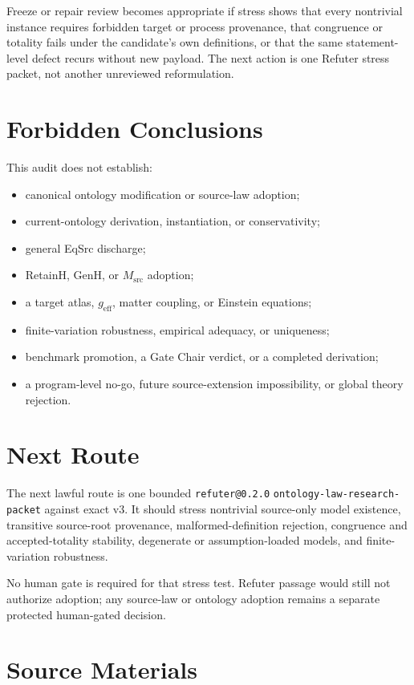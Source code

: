 \documentclass[11pt]{article}
\begin{document}
Freeze or repair review becomes appropriate if stress shows that every
nontrivial instance requires forbidden target or process provenance, that
congruence or totality fails under the candidate's own definitions, or that
the same statement-level defect recurs without new payload. The next action is
one Refuter stress packet, not another unreviewed reformulation.

\section{Forbidden Conclusions}

This audit does not establish:
\begin{itemize}[leftmargin=*]
  \item canonical ontology modification or source-law adoption;
  \item current-ontology derivation, instantiation, or conservativity;
  \item general EqSrc discharge;
  \item RetainH, GenH, or \(M_{\mathrm{src}}\) adoption;
  \item a target atlas, \(g_{\mathrm{eff}}\), matter coupling, or Einstein
  equations;
  \item finite-variation robustness, empirical adequacy, or uniqueness;
  \item benchmark promotion, a Gate Chair verdict, or a completed derivation;
  \item a program-level no-go, future source-extension impossibility, or
  global theory rejection.
\end{itemize}

\section{Next Route}

The next lawful route is one bounded \texttt{refuter@0.2.0}
\texttt{ontology-law-research-packet} against exact v3. It should stress
nontrivial source-only model existence, transitive source-root provenance,
malformed-definition rejection, congruence and accepted-totality stability,
degenerate or assumption-loaded models, and finite-variation robustness.

No human gate is required for that stress test. Refuter passage would still
not authorize adoption; any source-law or ontology adoption remains a separate
protected human-gated decision.

\section{Source Materials}
\end{document}
